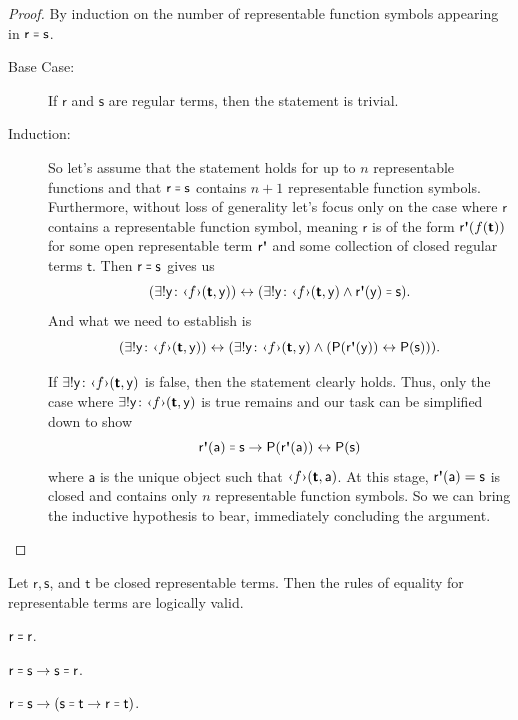 \documentclass{article}
\theoremstyle{customstyle}
\newenvironment{prf}{\begin{mdframed}[skipabove=5pt, backgroundcolor=Gray!10, topline=false, bottomline=false, leftline=false, rightline=false]\begin{proof}}{\end{proof}\end{mdframed}}
\newcommand{\qu}[1]{\mathsf{#1}}
\newcommand{\eq}{\mathrel{\resizebox{1.15\height}{1.15\height}{=}}}
\newcommand{\rep}[1]{\text{\guilsinglleft$#1$\guilsinglright}}
\newcommand{\qutick}{\textbf{\textquotesingle}}
\begin{document}
\begin{prf}
  By induction on the number of representable function symbols appearing in $\qu{r} \eq \qu{s}$.
  \begin{description}
    \item[Base Case:]
          If $\qu{r}$ and $\qu{s}$ are regular terms, then the statement is trivial.
    \item[Induction:]
          So let's assume that the statement holds for up to $n$ representable functions and that $\qu{r \eq s}$ contains $n + 1$ representable function symbols. Furthermore, without loss of generality let's focus only on the case where $\qu{r}$ contains a representable function symbol, meaning $\qu{r}$ is of the form $\qu{r\qutick}(f(\bm{\qu{t}}))$ for some open representable term $\qu{r\qutick}$ and some collection of closed regular terms $\bm{\qu{t}}$. Then $\qu{r \eq s}$ gives us
          \[
            \qu{(\exists! y \colon \rep{f}(\bm{\qu{t}}, y)) \leftrightarrow (\exists! y \colon \rep{f}(\bm{\qu{t}}, y) \land r\qutick(y) \eq s)}.
          \]
          And what we need to establish is
          \[
            \qu{(\exists! y \colon \rep{f}(\bm{\qu{t}}, y)) \leftrightarrow (\exists! y \colon \rep{f}(\bm{\qu{t}}, y) \land (P(r\qutick(y)) \leftrightarrow P(s)))}.
          \]

          If $\qu{\exists! y \colon \rep{f}(\bm{\qu{t}}, y)}$ is false, then the statement clearly holds. Thus, only the case where $\qu{\exists! y \colon \rep{f}(\bm{\qu{t}}, y)}$ is true remains and our task can be simplified down to show
          \[
            \qu{r\qutick(a) \eq s \rightarrow P(r\qutick(a)) \leftrightarrow P(s)}
          \]
          where $\qu{a}$ is the unique object such that $\qu{\rep{f}(\bm{\qu{t}}, a)}$. At this stage, $\qu{r\qutick(a) = s}$ is closed and contains only $n$ representable function symbols. So we can bring the inductive hypothesis to bear, immediately concluding the argument.\qedhere
  \end{description}
\end{prf}

\begin{lemma}\label{lm-eq}
  Let $\qu{r, s}$, and $\qu{t}$ be closed representable terms. Then the rules of equality for representable terms are logically valid.
  \begin{description}[leftmargin=!, labelwidth=\widthof{Transitivity:}]
    \item[Reflexivity:] $\qu{r \eq r}$.
    \item[Symmetry:] $\qu{r \eq s \rightarrow s \eq r}$.
    \item[Transitivity:] $\qu{r \eq s \rightarrow (s \eq t \rightarrow r \eq t)}$.
  \end{description}
\end{lemma}
\end{document}
